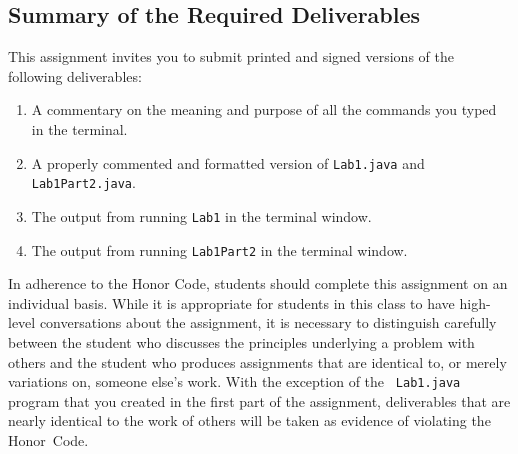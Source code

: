 \vspace*{-.1in}
\subsection*{Summary of the Required Deliverables}

This assignment invites you to submit printed and signed versions of the following deliverables:

\vspace*{-.1in}
\begin{enumerate}
  \setlength{\itemsep}{0in}
  \item A commentary on the meaning and purpose of all the commands you typed in the terminal.
  \item A properly commented and formatted version of {\tt Lab1.java} and {\tt Lab1Part2.java}.
  \item The output from running {\tt Lab1} in the terminal window.
  \item The output from running {\tt Lab1Part2} in the terminal window.
\end{enumerate}
\vspace*{-.1in}

In adherence to the Honor Code, students should complete this assignment on an individual basis. While it is appropriate
for students in this class to have high-level conversations about the assignment, it is necessary to distinguish
carefully between the student who discusses the principles underlying a problem with others and the student who produces
assignments that are identical to, or merely variations on, someone else's work.  With the exception of the {\tt
Lab1.java} program that you created in the first part of the assignment, deliverables that are nearly identical to the
work of others will be taken as evidence of violating the \mbox{Honor Code}.




